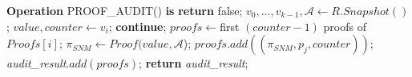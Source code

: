 \documentclass[11pt]{article}
\theoremstyle{definition}
\begin{document}
\begin{algorithm}
\begin{algorithmic}[1]
    \Statex

    \Statex \textbf{Operation} PROOF\_AUDIT() \textbf{is} 
    \State \textbf{return} false;
    \EndIf
    \State $v_0,\ldots,v_{k-1},\mathcal{A}\leftarrow R.Snapshot()$;
    \State $value, counter\leftarrow v_i$;
    \State \textbf{continue};
    \EndIf
    \State $proofs\leftarrow$first $(counter-1)$ proofs of $Proofs[i]$;
    \State $\pi_{SNM} \leftarrow Proof(value,\mathcal{A}$);
    \State $proofs.add((\pi_{SNM},p_j,counter))$;
    \EndIf
    \State \textit{audit\_result}$.add(proofs)$;\hfill {}
    \EndFor 
    \State \textbf{return} \textit{audit\_result};
    \end{algorithmic}
\end{algorithm}
\end{document}
